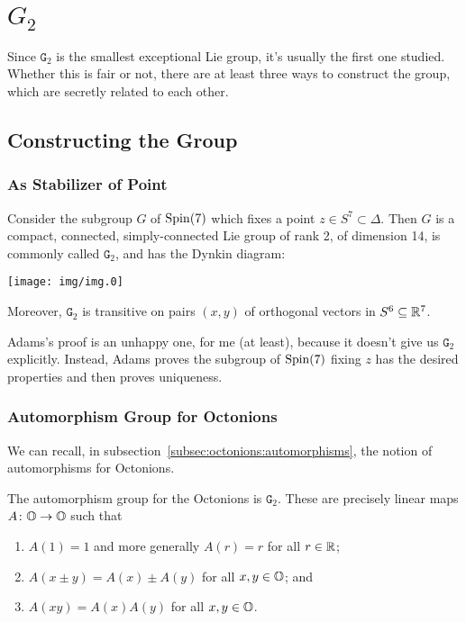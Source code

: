 \chapter{$G_{2}$}

\M
Since $\mathtt{G}_{2}$ is the smallest exceptional Lie group, it's
usually the first one studied. Whether this is fair or not, there are at
least three ways to construct the group, which are secretly related to
each other.

\section{Constructing the Group}

\subsection{As Stabilizer of Point}

\begin{theorem}\label{thm:g2:as-subgroup-of-spin-7}
Consider the subgroup $G$ of $\operatorname{Spin}(7)$ which fixes a point $z\in S^{7}\subset\Delta$.
Then $G$ is a compact, connected, simply-connected Lie group of rank 2,
of dimension 14, is commonly called $\mathtt{G}_{2}$, and has the Dynkin
diagram: 
\begin{center}
\texttt{[image: img/img.0]}
\end{center}
Moreover, $\mathtt{G}_{2}$ is
transitive on pairs $(x,y)$ of orthogonal vectors in $S^{6}\subseteq\mathbb{R}^{7}$.
\end{theorem}

Adams's proof is an unhappy one, for me (at least), because it doesn't
give us $\mathtt{G}_{2}$ explicitly. Instead, Adams proves the subgroup
of $\operatorname{Spin}(7)$ fixing $z$ has the desired properties and then proves
uniqueness. 

\subsection{Automorphism Group for Octonions}

\M
We can recall, in subsection~\ref{subsec:octonions:automorphisms},
the notion of automorphisms for Octonions.

\begin{definition}\label{defn:g2:as-aut-oo}
The automorphism group for the Octonions is $\mathtt{G}_{2}$. These are
precisely linear maps $A\colon\mathbb{O}\to\mathbb{O}$ such that
\begin{enumerate}
\item $A(1)=1$ and more generally $A(r)=r$ for all $r\in\mathbb{R}$;
\item $A(x\pm y)=A(x)\pm A(y)$ for all $x,y\in\mathbb{O}$; and
\item $A(xy)=A(x)A(y)$ for all $x,y\in\mathbb{O}$.
\end{enumerate}
\end{definition}

